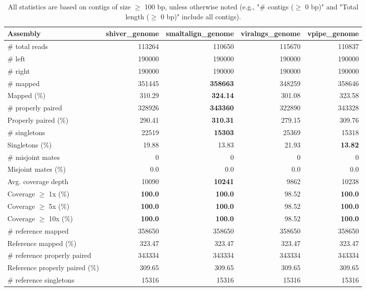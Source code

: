 \documentclass[12pt,a4paper]{article}
\begin{document}
\begin{table}[ht]
\begin{center}
\caption{All statistics are based on contigs of size $\geq$ 100 bp, unless otherwise noted (e.g., "\# contigs ($\geq$ 0 bp)" and "Total length ($\geq$ 0 bp)" include all contigs).}
\begin{tabular}{|l*{4}{|r}|}
\hline
Assembly & shiver\_genome & smaltalign\_genome & viralngs\_genome & vpipe\_genome \\ \hline
\# total reads & 113264 & 110650 & 115670 & 110837 \\ \hline
\# left & 190000 & 190000 & 190000 & 190000 \\ \hline
\# right & 190000 & 190000 & 190000 & 190000 \\ \hline
\# mapped & 351445 & {\bf 358663} & 348259 & 358646 \\ \hline
Mapped (\%) & 310.29 & {\bf 324.14} & 301.08 & 323.58 \\ \hline
\# properly paired & 328926 & {\bf 343360} & 322890 & 343328 \\ \hline
Properly paired (\%) & 290.41 & {\bf 310.31} & 279.15 & 309.76 \\ \hline
\# singletons & 22519 & {\bf 15303} & 25369 & 15318 \\ \hline
Singletons (\%) & 19.88 & 13.83 & 21.93 & {\bf 13.82} \\ \hline
\# misjoint mates & 0 & 0 & 0 & 0 \\ \hline
Misjoint mates (\%) & 0.0 & 0.0 & 0.0 & 0.0 \\ \hline
Avg. coverage depth & 10090 & {\bf 10241} & 9862 & 10238 \\ \hline
Coverage $\geq$ 1x (\%) & {\bf 100.0} & {\bf 100.0} & 98.52 & {\bf 100.0} \\ \hline
Coverage $\geq$ 5x (\%) & {\bf 100.0} & {\bf 100.0} & 98.52 & {\bf 100.0} \\ \hline
Coverage $\geq$ 10x (\%) & {\bf 100.0} & {\bf 100.0} & 98.52 & {\bf 100.0} \\ \hline
\# reference mapped & 358650 & 358650 & 358650 & 358650 \\ \hline
Reference mapped (\%) & 323.47 & 323.47 & 323.47 & 323.47 \\ \hline
\# reference properly paired & 343334 & 343334 & 343334 & 343334 \\ \hline
Reference properly paired (\%) & 309.65 & 309.65 & 309.65 & 309.65 \\ \hline
\# reference singletons & 15316 & 15316 & 15316 & 15316 \\ \hline

\end{tabular}
\end{center}
\end{table}
\end{document}
